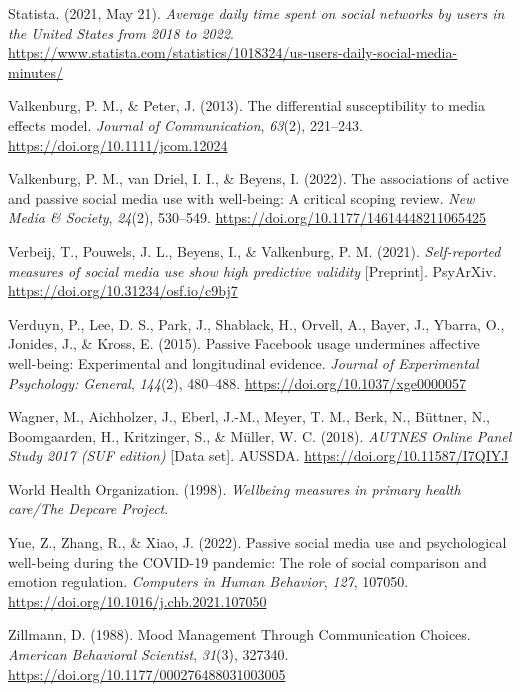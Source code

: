 \documentclass[
  man,mask,floatsintext]{apa7}
\newlength{\cslhangindent}
\newlength{\cslentryspacingunit} %
\newenvironment{CSLReferences}[2] %
 {%
  \setlength{\parindent}{0pt}
  \ifodd #1
  \let\oldpar\par
  \def\par{\hangindent=\cslhangindent\oldpar}
  \fi
  \setlength{\parskip}{#2\cslentryspacingunit}
 }%
 {}
\begin{document}
\begin{CSLReferences}{1}{0}
\leavevmode{}%
Statista. (2021, May 21). \emph{Average daily time spent on social networks by users in the {United States} from 2018 to 2022}. \url{https://www.statista.com/statistics/1018324/us-users-daily-social-media-minutes/}

\leavevmode{}%
Valkenburg, P. M., \& Peter, J. (2013). The differential susceptibility to media effects model. \emph{Journal of Communication}, \emph{63}(2), 221--243. \url{https://doi.org/10.1111/jcom.12024}

\leavevmode{}%
Valkenburg, P. M., van Driel, I. I., \& Beyens, I. (2022). The associations of active and passive social media use with well-being: {A} critical scoping review. \emph{New Media \& Society}, \emph{24}(2), 530--549. \url{https://doi.org/10.1177/14614448211065425}

\leavevmode{}%
Verbeij, T., Pouwels, J. L., Beyens, I., \& Valkenburg, P. M. (2021). \emph{Self-reported measures of social media use show high predictive validity} {[}Preprint{]}. {PsyArXiv}. \url{https://doi.org/10.31234/osf.io/c9bj7}

\leavevmode{}%
Verduyn, P., Lee, D. S., Park, J., Shablack, H., Orvell, A., Bayer, J., Ybarra, O., Jonides, J., \& Kross, E. (2015). Passive {Facebook} usage undermines affective well-being: {Experimental} and longitudinal evidence. \emph{Journal of Experimental Psychology: General}, \emph{144}(2), 480--488. \url{https://doi.org/10.1037/xge0000057}

\leavevmode{}%
Wagner, M., Aichholzer, J., Eberl, J.-M., Meyer, T. M., Berk, N., Büttner, N., Boomgaarden, H., Kritzinger, S., \& Müller, W. C. (2018). \emph{{AUTNES Online Panel Study} 2017 ({SUF} edition)} {[}Data set{]}. {AUSSDA}. \url{https://doi.org/10.11587/I7QIYJ}

\leavevmode{}%
World Health Organization. (1998). \emph{Wellbeing measures in primary health care/{The Depcare Project}}.

\leavevmode{}%
Yue, Z., Zhang, R., \& Xiao, J. (2022). Passive social media use and psychological well-being during the {COVID-19} pandemic: {The} role of social comparison and emotion regulation. \emph{Computers in Human Behavior}, \emph{127}, 107050. \url{https://doi.org/10.1016/j.chb.2021.107050}

\leavevmode{}%
Zillmann, D. (1988). Mood {Management Through Communication Choices}. \emph{American Behavioral Scientist}, \emph{31}(3), 327340. \url{https://doi.org/10.1177/000276488031003005}

\end{CSLReferences}
\end{document}
